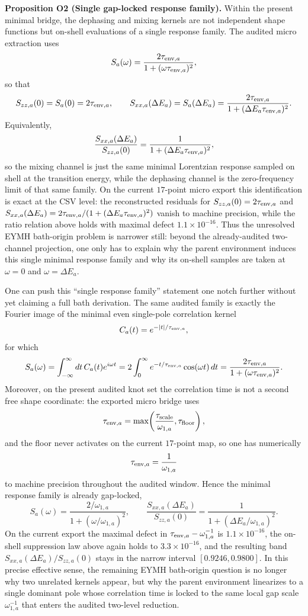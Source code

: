 \documentclass[aps,prd,onecolumn,notitlepage,nofootinbib,superscriptaddress,11pt,floatfix]{revtex4-2}
\begin{document}
\medskip\noindent\textbf{Proposition O2 (Single gap-locked response family).}
Within the present minimal bridge, the dephasing and mixing kernels are not independent shape functions but on-shell evaluations of a single response family. The audited micro extraction uses
\[
S_a(\omega)=\frac{2\tau_{{\rm env},a}}{1+(\omega\tau_{{\rm env},a})^2},
\]
so that
\[
S_{zz,a}(0)=S_a(0)=2\tau_{{\rm env},a},
\qquad
S_{xx,a}(\Delta E_a)=S_a(\Delta E_a)=\frac{2\tau_{{\rm env},a}}{1+(\Delta E_a\tau_{{\rm env},a})^2}.
\]
Equivalently,
\[
\frac{S_{xx,a}(\Delta E_a)}{S_{zz,a}(0)}
=\frac{1}{1+(\Delta E_a\tau_{{\rm env},a})^2},
\]
so the mixing channel is just the same minimal Lorentzian response sampled on shell at the transition energy, while the dephasing channel is the zero-frequency limit of that same family. On the current $17$-point micro export this identification is exact at the CSV level: the reconstructed residuals for $S_{zz,a}(0)=2\tau_{{\rm env},a}$ and $S_{xx,a}(\Delta E_a)=2\tau_{{\rm env},a}/(1+(\Delta E_a\tau_{{\rm env},a})^2)$ vanish to machine precision, while the ratio relation above holds with maximal defect $1.1\times10^{-16}$. Thus the unresolved EYMH bath-origin problem is narrower still: beyond the already-audited two-channel projection, one only has to explain why the parent environment induces this single minimal response family and why its on-shell samples are taken at $\omega=0$ and $\omega=\Delta E_a$.

One can push this ``single response family'' statement one notch further without yet claiming a full bath derivation. The same audited family is exactly the Fourier image of the minimal even single-pole correlation kernel
\[
C_a(t)=e^{-|t|/\tau_{{\rm env},a}},
\]
for which
\[
S_a(\omega)=\int_{-\infty}^{\infty}dt\,C_a(t)e^{i\omega t}
=2\int_0^\infty e^{-t/\tau_{{\rm env},a}}\cos(\omega t)\,dt
=\frac{2\tau_{{\rm env},a}}{1+(\omega\tau_{{\rm env},a})^2}.
\]
Moreover, on the present audited knot set the correlation time is not a second free shape coordinate: the exported micro bridge uses
\[
\tau_{{\rm env},a}=\max\!\left(\frac{\tau_{\rm scale}}{\omega_{1,a}},\tau_{\rm floor}\right),
\]
and the floor never activates on the current $17$-point map, so one has numerically
\[
\tau_{{\rm env},a}=\frac{1}{\omega_{1,a}}
\]
to machine precision throughout the audited window. Hence the minimal response family is already gap-locked,
\[
S_a(\omega)=\frac{2/\omega_{1,a}}{1+(\omega/\omega_{1,a})^2},
\qquad
\frac{S_{xx,a}(\Delta E_a)}{S_{zz,a}(0)}
=\frac{1}{1+(\Delta E_a/\omega_{1,a})^2}.
\]
On the current export the maximal defect in $\tau_{{\rm env},a}-\omega_{1,a}^{-1}$ is $1.1\times10^{-16}$, the on-shell suppression law above again holds to $3.3\times10^{-16}$, and the resulting band $S_{xx,a}(\Delta E_a)/S_{zz,a}(0)$ stays in the narrow interval $[0.9246,0.9800]$. In this precise effective sense, the remaining EYMH bath-origin question is no longer why two unrelated kernels appear, but why the parent environment linearizes to a single dominant pole whose correlation time is locked to the same local gap scale $\omega_{1,a}^{-1}$ that enters the audited two-level reduction.
\end{document}
